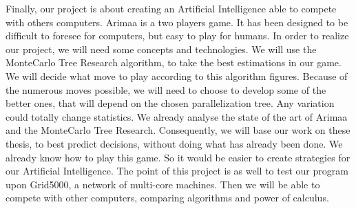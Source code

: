 
Finally, our project is about creating an Artificial Intelligence able to compete with others computers.
\newline
\newline
Arimaa is a two players game. It has been designed to be difficult to foresee for computers, but easy to play for humans. 
In order to realize our project, we will need some concepts and technologies. 
We will use the MonteCarlo Tree Research algorithm, to take the best estimations in our game. We will decide what move to play according to this algorithm figures. Because of the numerous moves possible, we will need to choose to develop some of the better ones, that will depend on the chosen parallelization tree. Any variation could totally change statistics.
We already analyse the state of the art of Arimaa and the MonteCarlo Tree Research. Consequently, we will base our work on these thesis, to best predict decisions, without doing what has already been done.
We already know how to play this game. So it would be easier to create strategies for our Artificial Intelligence. 
\newline
\newline
The point of this project is as well to test our program upon Grid5000, a network of multi-core machines. Then we will be able to compete with other computers, comparing algorithms and power of calculus.
